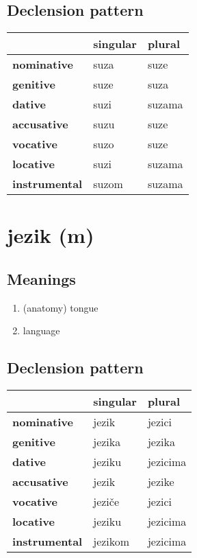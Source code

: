 \subsection*{Declension pattern}
\begin{tabularx}{\linewidth}{Xll}
\toprule
{} & singular &  plural \\
\midrule
\textbf{nominative  } &     suza &    suze \\
\textbf{genitive    } &     suze &    suza \\
\textbf{dative      } &     suzi &  suzama \\
\textbf{accusative  } &     suzu &    suze \\
\textbf{vocative    } &     suzo &    suze \\
\textbf{locative    } &     suzi &  suzama \\
\textbf{instrumental} &    suzom &  suzama \\
\bottomrule
\end{tabularx}

\filbreak
\section{jezik (m)}
\subsection*{Meanings}
\begin{enumerate}
\item (anatomy) tongue
\item language
\end{enumerate}
\subsection*{Declension pattern}
\begin{tabularx}{\linewidth}{Xll}
\toprule
{} & singular &    plural \\
\midrule
\textbf{nominative  } &    jezik &    jezici \\
\textbf{genitive    } &   jezika &    jezika \\
\textbf{dative      } &   jeziku &  jezicima \\
\textbf{accusative  } &    jezik &    jezike \\
\textbf{vocative    } &   jeziče &    jezici \\
\textbf{locative    } &   jeziku &  jezicima \\
\textbf{instrumental} &  jezikom &  jezicima \\
\bottomrule
\end{tabularx}

